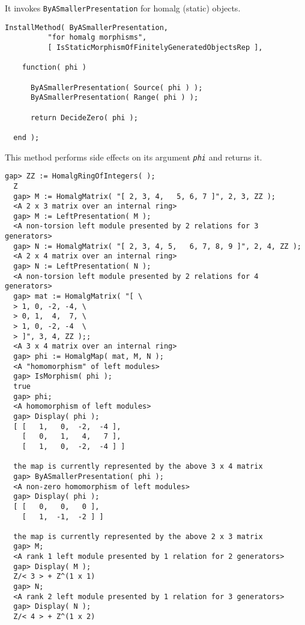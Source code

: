 \documentclass[a4paper,11pt]{report}
\begin{document}
{{{ It invokes \texttt{ByASmallerPresentation} for \textsf{homalg} (static) objects. 
\begin{Verbatim}[fontsize=\small,frame=single,label=Code]
  InstallMethod( ByASmallerPresentation,
          "for homalg morphisms",
          [ IsStaticMorphismOfFinitelyGeneratedObjectsRep ],
          
    function( phi )
      
      ByASmallerPresentation( Source( phi ) );
      ByASmallerPresentation( Range( phi ) );
      
      return DecideZero( phi );
      
  end );
\end{Verbatim}
 This method performs side effects on its argument \mbox{\texttt{\slshape phi}} and returns it. 
\begin{Verbatim}[fontsize=\small,frame=single,label=Example]
  gap> ZZ := HomalgRingOfIntegers( );
  Z
  gap> M := HomalgMatrix( "[ 2, 3, 4,   5, 6, 7 ]", 2, 3, ZZ );
  <A 2 x 3 matrix over an internal ring>
  gap> M := LeftPresentation( M );
  <A non-torsion left module presented by 2 relations for 3 generators>
  gap> N := HomalgMatrix( "[ 2, 3, 4, 5,   6, 7, 8, 9 ]", 2, 4, ZZ );
  <A 2 x 4 matrix over an internal ring>
  gap> N := LeftPresentation( N );
  <A non-torsion left module presented by 2 relations for 4 generators>
  gap> mat := HomalgMatrix( "[ \
  > 1, 0, -2, -4, \
  > 0, 1,  4,  7, \
  > 1, 0, -2, -4  \
  > ]", 3, 4, ZZ );;
  <A 3 x 4 matrix over an internal ring>
  gap> phi := HomalgMap( mat, M, N );
  <A "homomorphism" of left modules>
  gap> IsMorphism( phi );
  true
  gap> phi;
  <A homomorphism of left modules>
  gap> Display( phi );
  [ [   1,   0,  -2,  -4 ],
    [   0,   1,   4,   7 ],
    [   1,   0,  -2,  -4 ] ]
  
  the map is currently represented by the above 3 x 4 matrix
  gap> ByASmallerPresentation( phi );
  <A non-zero homomorphism of left modules>
  gap> Display( phi );
  [ [   0,   0,   0 ],
    [   1,  -1,  -2 ] ]
  
  the map is currently represented by the above 2 x 3 matrix
  gap> M;
  <A rank 1 left module presented by 1 relation for 2 generators>
  gap> Display( M );
  Z/< 3 > + Z^(1 x 1)
  gap> N;
  <A rank 2 left module presented by 1 relation for 3 generators>
  gap> Display( N );
  Z/< 4 > + Z^(1 x 2)
\end{Verbatim}
 }

 }

  }

   
\end{document}
